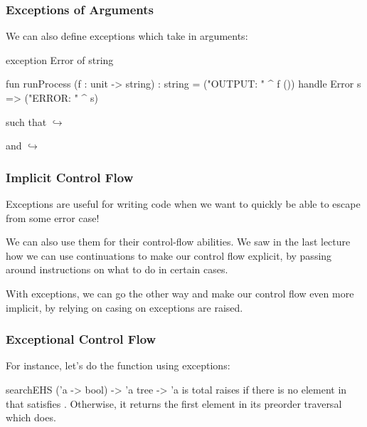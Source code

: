 \documentclass[aspectratio=169]{beamer}
\begin{document}
\begin{frame}[fragile]
  \frametitle{Exceptions of Arguments}

  We can also define exceptions which take in arguments:
  \begin{codeblock}
    exception Error of string

    fun runProcess (f : unit -> string) : string =
      ("OUTPUT: " ^ f ()) 
      handle Error s => ("ERROR: " ^ s)  
  \end{codeblock}

  \pause
  \vspace{\fill}

  such that
   $\hookrightarrow$ 

  \pause
  \vspace{\fill}

  and 
   $\hookrightarrow$ 
\end{frame}


\begin{frame}[fragile]
  \frametitle{Implicit Control Flow}

  Exceptions are useful for writing code when we want to quickly be able to escape
  from some error case!

  \pause
  \vspace{\fill}

  We can also use them for their control-flow abilities. We saw in the last lecture
  how we can use continuations to make our control flow explicit, by passing
  around instructions on what to do in certain cases.

  \pause
  \vspace{\fill}

  With exceptions, we can go the other way and make our control flow even more implicit,
  by relying on casing on exceptions are raised. 
\end{frame}

\begin{frame}[fragile]
  \frametitle{Exceptional Control Flow}
  
  For instance, let's do the  function using exceptions:

  \pause
  \spec
    {searchEHS}
    {('a -> bool) -> 'a tree -> 'a}
    { is total}
    { raises  if there is no element in
     that satisfies . Otherwise, it returns the first element
    in its preorder traversal which does.}
\end{frame}
\end{document}
